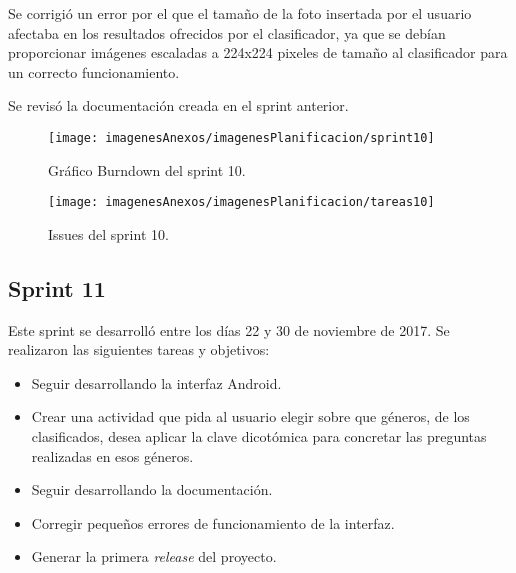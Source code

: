 Se corrigió un error por el que el tamaño de la foto insertada por el usuario afectaba en los resultados ofrecidos por el clasificador, ya que se debían proporcionar imágenes escaladas a 224x224 pixeles de tamaño al clasificador para un correcto funcionamiento.

Se revisó la documentación creada en el sprint anterior.

\begin{figure}[h]
    \begin{center}%
        \begin{center}%
          \texttt{[image: imagenesAnexos/imagenesPlanificacion/sprint10]}%
          \caption{Gráfico Burndown del sprint 10.}%
          \label{figSprint10}%
        \end{center}%
  	\end{center}%
\end{figure}%

\begin{figure}[h]
    \begin{center}%
        \begin{center}%
          \texttt{[image: imagenesAnexos/imagenesPlanificacion/tareas10]}%
          \caption{Issues del sprint 10.}%
          \label{figTareas10}%
        \end{center}%
  	\end{center}%
\end{figure}%

\newpage

\subsection{Sprint 11}

Este sprint se desarrolló entre los días 22 y 30 de noviembre de 2017. Se realizaron las siguientes tareas y objetivos:

\begin{itemize}
	\item Seguir desarrollando la interfaz Android.
	\item Crear una actividad que pida al usuario elegir sobre que géneros, de los clasificados, desea aplicar la clave dicotómica para concretar las preguntas realizadas en esos géneros.
	\item Seguir desarrollando la documentación.
	\item Corregir pequeños errores de funcionamiento de la interfaz.
	\item Generar la primera \textit{release} del proyecto.
\end{itemize}

